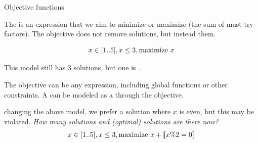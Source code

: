 \documentclass{cons-beamer}
\begin{document}
\begin{frame}{Objective functions}

	The  is an expression that we aim to minimize or maximize (\eg the sum of must-try factors).
	The objective does not remove solutions, but instead  them.

	$$
	x \in [1..5], x \leq 3, \text{maximize}~x
	$$

	 This model still has 3 solutions, but one is .


	 \parBreak

	The objective can be any expression, including global functions or other constraints.
	A  can be modeled as a  through the objective.


	\parBreak
	\Eg changing the above model, we prefer a solution where $x$ is even, but this may be violated. \textit{How many solutions and (optimal) solutions are there now?}
  \begin{align}
	x \in [1..5], x \leq 3, \text{maximize}~x + \llbracket x \% 2 = 0 \rrbracket
  \end{align}
\end{frame}
\end{document}
